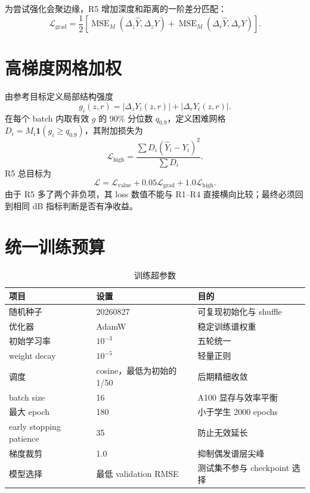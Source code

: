 \documentclass[UTF8,12pt,openany]{ctexrep}
\begin{document}
为尝试强化会聚边缘，R5 增加深度和距离的一阶差分匹配：
\begin{equation}
  \mathcal{L}_{\mathrm{grad}}=\frac{1}{2}
  \left[
  \operatorname{MSE}_M(\Delta_z\widehat{Y},\Delta_zY)+
  \operatorname{MSE}_M(\Delta_r\widehat{Y},\Delta_rY)
  \right].
\end{equation}

\section{高梯度网格加权}

由参考目标定义局部结构强度
\begin{equation}
  g_i(z,r)=|\Delta_zY_i(z,r)|+|\Delta_rY_i(z,r)|.
\end{equation}
在每个 batch 内取有效 $g$ 的 90\% 分位数 $q_{0.9}$，定义困难网格
$D_i=M_i\mathbf{1}(g_i\ge q_{0.9})$，其附加损失为
\begin{equation}
  \mathcal{L}_{\mathrm{high}}=
  \frac{\sum D_i(\widehat{Y}_i-Y_i)^2}{\sum D_i}.
\end{equation}
R5 总目标为
\begin{equation}
  \mathcal{L}=\mathcal{L}_{\mathrm{value}}+0.05\mathcal{L}_{\mathrm{grad}}
  +1.0\mathcal{L}_{\mathrm{high}}.
\end{equation}
由于 R5 多了两个非负项，其 loss 数值不能与 R1--R4 直接横向比较；最终必须回到相同 dB
指标判断是否有净收益。

\section{统一训练预算}

\begin{table}[H]
\centering
\caption{训练超参数}
\begin{tabularx}{\textwidth}{L{4.4cm}Y L{4.2cm}}
\toprule
项目 & 设置 & 目的 \\
\midrule
随机种子 & 20260827 & 可复现初始化与 shuffle \\
优化器 & AdamW & 稳定训练谱权重 \\
初始学习率 & $10^{-3}$ & 五轮统一 \\
weight decay & $10^{-5}$ & 轻量正则 \\
调度 & cosine，最低为初始的 1/50 & 后期精细收敛 \\
batch size & 16 & A100 显存与效率平衡 \\
最大 epoch & 180 & 小于学生 2000 epochs \\
early stopping patience & 35 & 防止无效延长 \\
梯度裁剪 & 1.0 & 抑制偶发谱层尖峰 \\
模型选择 & 最低 validation RMSE & 测试集不参与 checkpoint 选择 \\
\bottomrule
\end{tabularx}
\end{table}
\end{document}
